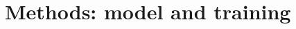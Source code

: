 \documentclass[11pt]{article}
\begin{document}
\section{Methods: model and training}

\end{document}

